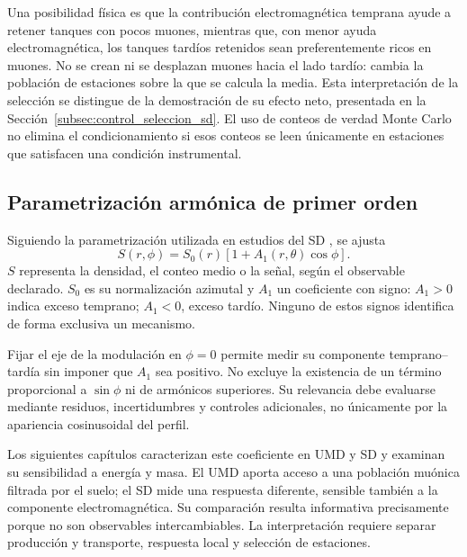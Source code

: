 Una posibilidad física es que la contribución electromagnética temprana ayude a retener tanques con pocos muones, mientras que, con menor ayuda electromagnética, los tanques tardíos retenidos sean preferentemente ricos en muones. No se crean ni se desplazan muones hacia el lado tardío: cambia la población de estaciones sobre la que se calcula la media. Esta interpretación de la selección se distingue de la demostración de su efecto neto, presentada en la Sección~\ref{subsec:control_seleccion_sd}. El uso de conteos de verdad Monte Carlo no elimina el condicionamiento si esos conteos se leen únicamente en estaciones que satisfacen una condición instrumental.

\subsection{Parametrización armónica de primer orden}
\label{subsec:parametrizacion}

Siguiendo la parametrización utilizada en estudios del SD \cite{Billoir2002,BradfieldThesis}, se ajusta
\begin{equation}
S(r,\phi)=S_0(r)\left[1+A_1(r,\theta)\cos\phi\right].
\label{eq:asimetria_a1}
\end{equation}
$S$ representa la densidad, el conteo medio o la señal, según el observable declarado. $S_0$ es su normalización azimutal y $A_1$ un coeficiente con signo: $A_1>0$ indica exceso temprano; $A_1<0$, exceso tardío. Ninguno de estos signos identifica de forma exclusiva un mecanismo.

Fijar el eje de la modulación en $\phi=0$ permite medir su componente temprano--tardía sin imponer que $A_1$ sea positivo. No excluye la existencia de un término proporcional a $\sin\phi$ ni de armónicos superiores. Su relevancia debe evaluarse mediante residuos, incertidumbres y controles adicionales, no únicamente por la apariencia cosinusoidal del perfil.

Los siguientes capítulos caracterizan este coeficiente en UMD y SD y examinan su sensibilidad a energía y masa. El UMD aporta acceso a una población muónica filtrada por el suelo; el SD mide una respuesta diferente, sensible también a la componente electromagnética. Su comparación resulta informativa precisamente porque no son observables intercambiables. La interpretación requiere separar producción y transporte, respuesta local y selección de estaciones.

\newpage
